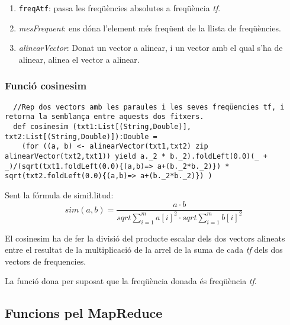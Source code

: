 \documentclass[11pt,a4paper,twoside]{report}
\begin{document}
\begin{enumerate}
  \item \texttt{freqAtf}: passa les freqüències absolutes a freqüència \textit{tf}.
  \item \textit{mesFrequent}: ens dóna l'element més freqüent de la llista de freqüències.
  \item \textit{alinearVector}: Donat un vector a alinear, i un vector amb el qual s'ha de alinear, alinea el vector a alinear.
\end{enumerate}

\subsubsection{Funció cosinesim}

\begin{lstlisting}
  //Rep dos vectors amb les paraules i les seves freqüencies tf, i retorna la semblança entre aquests dos fitxers.
  def cosinesim (txt1:List[(String,Double)], txt2:List[(String,Double)]):Double =
    (for ((a, b) <- alinearVector(txt1,txt2) zip alinearVector(txt2,txt1)) yield a._2 * b._2).foldLeft(0.0)(_ + _)/(sqrt(txt1.foldLeft(0.0){(a,b)=> a+(b._2*b._2)}) * sqrt(txt2.foldLeft(0.0){(a,b)=> a+(b._2*b._2)}) )
\end{lstlisting}

Sent la fórmula de simi\l.litud: \[sim(a,b) = \frac{a \cdot b}{sqrt{\sum_{i=1}^m a[i]^2} \cdot sqrt{\sum_{i=1}^m b[i]^2}}\]

El cosinesim ha de fer la divisió del producte escalar dels dos vectors alineats entre el resultat de la multiplicació de la arrel de la suma de cada \textit{tf} dels dos vectors de frequencies.

La funció dona per suposat que la freqüència donada és freqüència \textit{tf}.

\subsection{Funcions pel MapReduce}
\end{document}
